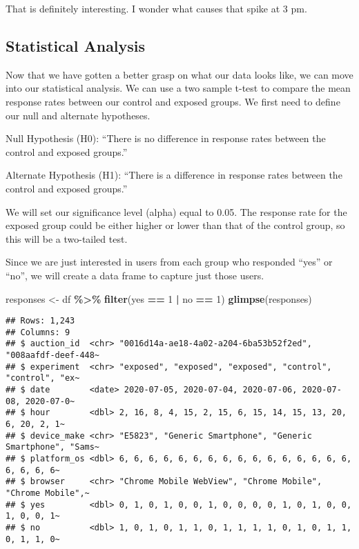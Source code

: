 \documentclass[
]{article}
\newenvironment{Shaded}{\begin{snugshade}}{\end{snugshade}}
\newcommand{\DecValTok}[1]{\textcolor[rgb]{0.00,0.00,0.81}{#1}}
\newcommand{\FunctionTok}[1]{\textcolor[rgb]{0.13,0.29,0.53}{\textbf{#1}}}
\newcommand{\NormalTok}[1]{#1}
\newcommand{\OtherTok}[1]{\textcolor[rgb]{0.56,0.35,0.01}{#1}}
\newcommand{\SpecialCharTok}[1]{\textcolor[rgb]{0.81,0.36,0.00}{\textbf{#1}}}
\begin{document}
That is definitely interesting. I wonder what causes that spike at 3 pm.

\hypertarget{statistical-analysis}{%
\subsection{Statistical Analysis}\label{statistical-analysis}}

Now that we have gotten a better grasp on what our data looks like, we
can move into our statistical analysis. We can use a two sample t-test
to compare the mean response rates between our control and exposed
groups. We first need to define our null and alternate hypotheses.

Null Hypothesis (H0): ``There is no difference in response rates between
the control and exposed groups.''

Alternate Hypothesis (H1): ``There is a difference in response rates
between the control and exposed groups.''

We will set our significance level (alpha) equal to 0.05. The response
rate for the exposed group could be either higher or lower than that of
the control group, so this will be a two-tailed test.

Since we are just interested in users from each group who responded
``yes'' or ``no'', we will create a data frame to capture just those
users.

\begin{Shaded}
\begin{Highlighting}[]
\NormalTok{responses }\OtherTok{\textless{}{-}}\NormalTok{ df }\SpecialCharTok{\%\textgreater{}\%}
  \FunctionTok{filter}\NormalTok{(yes }\SpecialCharTok{==} \DecValTok{1} \SpecialCharTok{|}\NormalTok{ no }\SpecialCharTok{==} \DecValTok{1}\NormalTok{)}
\FunctionTok{glimpse}\NormalTok{(responses)}
\end{Highlighting}
\end{Shaded}

\begin{verbatim}
## Rows: 1,243
## Columns: 9
## $ auction_id  <chr> "0016d14a-ae18-4a02-a204-6ba53b52f2ed", "008aafdf-deef-448~
## $ experiment  <chr> "exposed", "exposed", "exposed", "control", "control", "ex~
## $ date        <date> 2020-07-05, 2020-07-04, 2020-07-06, 2020-07-08, 2020-07-0~
## $ hour        <dbl> 2, 16, 8, 4, 15, 2, 15, 6, 15, 14, 15, 13, 20, 6, 20, 2, 1~
## $ device_make <chr> "E5823", "Generic Smartphone", "Generic Smartphone", "Sams~
## $ platform_os <dbl> 6, 6, 6, 6, 6, 6, 6, 6, 6, 6, 6, 6, 6, 6, 6, 6, 6, 6, 6, 6~
## $ browser     <chr> "Chrome Mobile WebView", "Chrome Mobile", "Chrome Mobile",~
## $ yes         <dbl> 0, 1, 0, 1, 0, 0, 1, 0, 0, 0, 0, 1, 0, 1, 0, 0, 1, 0, 0, 1~
## $ no          <dbl> 1, 0, 1, 0, 1, 1, 0, 1, 1, 1, 1, 0, 1, 0, 1, 1, 0, 1, 1, 0~
\end{verbatim}
\end{document}
